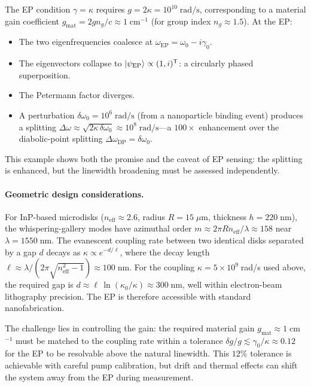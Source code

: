 The EP condition $\gamma = \kappa$ requires $g = 2\kappa = 10^{10}\;\mathrm{rad/s}$,
corresponding to a material gain coefficient
$g_{\mathrm{mat}} = 2g n_g/c \approx 1\;\mathrm{cm^{-1}}$
(for group index $n_g \approx 1.5$). At the EP:
\begin{itemize}
 \item The two eigenfrequencies coalesce at $\omega_{\mathrm{EP}} = \omega_0 - i\gamma_0$.
 \item The eigenvectors collapse to
 $|\psi_{\mathrm{EP}}\rangle \propto (1, i)^{\mathsf{T}}$:
 a circularly phased superposition.
 \item The Petermann factor diverges.
 \item A perturbation $\delta\omega_0 = 10^6\;\mathrm{rad/s}$ (from a
 nanoparticle binding event) produces a splitting
 $\Delta\omega \approx \sqrt{2\kappa\,\delta\omega_0} \approx
 10^8\;\mathrm{rad/s}$---a $100\times$ enhancement over the
 diabolic-point splitting $\Delta\omega_{\mathrm{DP}} = \delta\omega_0$.
\end{itemize}
This example shows both the promise and the caveat of EP sensing: the
splitting is enhanced, but the linewidth broadening must be assessed
independently.

\paragraph{Geometric design considerations.}
For InP-based microdisks ($n_{\mathrm{eff}} \approx 2.6$,
radius $R = 15\;\mu$m, thickness $h = 220\;$nm), the whispering-gallery
modes have azimuthal order $m \approx 2\pi R n_{\mathrm{eff}}/\lambda
\approx 158$ near $\lambda = 1550\;$nm. The evanescent coupling rate
between two identical disks separated by a gap $d$ decays as
$\kappa \propto e^{-d/\ell}$, where the decay length
$\ell \approx \lambda/(2\pi\sqrt{n_{\mathrm{eff}}^2 - 1}) \approx
100\;$nm. For the coupling $\kappa = 5 \times 10^9\;$rad/s used above,
the required gap is $d \approx \ell\,\ln(\kappa_0/\kappa) \approx
300\;$nm, well within electron-beam lithography precision. The EP is
therefore accessible with standard nanofabrication.

The challenge lies in controlling the gain: the required material gain
$g_{\mathrm{mat}} \approx 1\;$cm$^{-1}$ must be matched to the
coupling rate within a tolerance
$\delta g/g \lesssim \gamma_0/\kappa \approx 0.12$ for the EP to be
resolvable above the natural linewidth. This $12\%$ tolerance is
achievable with careful pump calibration, but drift and thermal effects
can shift the system away from the EP during measurement.

